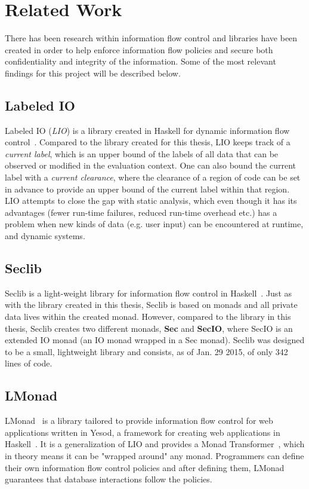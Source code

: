 \section{Related Work}
\label{chapter:related}
There has been research within information flow control and libraries have been created in order to help enforce information flow policies and secure both confidentiality and integrity of the information. Some of the most relevant findings for this project will be described below.
\subsection{Labeled IO}
Labeled IO (\emph{LIO}) is a library created in Haskell for dynamic information flow control~\cite{lio-2011}. Compared to the library created for this thesis, LIO keeps track of a \emph{current label}, which is an upper bound of the labels of all data that can be observed or modified in the evaluation context. One can also bound the current label with a \emph{current clearance}, where the clearance of a region of code can be set in advance to provide an upper bound of the current label within that region. LIO attempts to close the gap with static analysis, which even though it has its advantages (fewer run-time failures, reduced run-time overhead etc.) has a problem when new kinds of data (e.g. user input) can be encountered at runtime, and dynamic systems.
\subsection{Seclib}
Seclib is a light-weight library for information flow control in Haskell~\cite{seclib, seclib_git}. Just as with the library created in this thesis, Seclib is based on monads and all private data lives within the created monad. However, compared to the library in this thesis, Seclib creates two different monads, \textbf{Sec} and \textbf{SecIO}, where SecIO is an extended IO monad (an IO monad wrapped in a Sec monad). Seclib was designed to be a small, lightweight library and consists, as of Jan. 29 2015, of only 342 lines of code.
\subsection{LMonad}
LMonad~\cite{lmonad} is a library tailored to provide information flow control for web applications written in Yesod, a framework for creating web applications in Haskell~\cite{yesod}. It is a generalization of LIO and provides a Monad Transformer~\cite{monad-transformer}, which in theory means it can be "wrapped around" any monad. Programmers can define their own information flow control policies and after defining them, LMonad guarantees that database interactions follow the policies.
